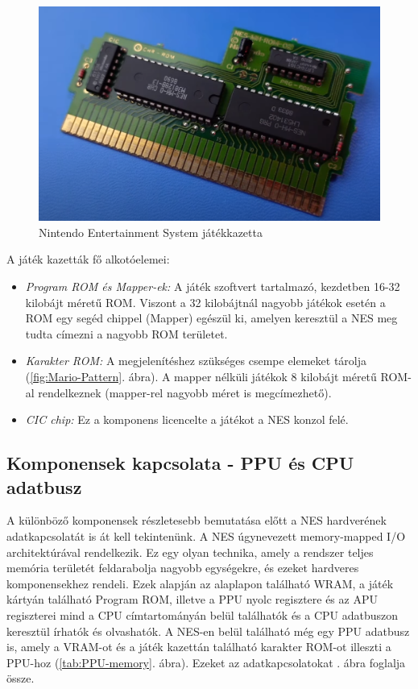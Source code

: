 \begin{figure}[H]
	\centering
	\includegraphics[width=150mm, keepaspectratio]{figures/Mario-Duckhunt-cartage}
	\caption{Nintendo Entertainment System játékkazetta \cite{NES_cartridge}}
	\label{fig:NES-Game-Cartridge}
\end{figure}

A  játék kazetták fő alkotóelemei:

\begin{itemize}
	\item \emph{Program ROM és Mapper-ek:} A játék szoftvert tartalmazó, kezdetben 16-32 kilobájt méretű ROM. Viszont a 32 kilobájtnál nagyobb játékok esetén a ROM egy segéd chippel (Mapper) egészül ki, amelyen keresztül a NES meg tudta címezni a nagyobb ROM területet. 
	\item \emph{Karakter ROM:} A megjelenítéshez szükséges csempe elemeket tárolja (\ref{fig:Mario-Pattern}. ábra). A mapper nélküli játékok 8 kilobájt méretű ROM-al rendelkeznek (mapper-rel nagyobb méret is megcímezhető). 
	\item \emph{CIC chip:} Ez a komponens licencelte a játékot a NES konzol felé.
\end{itemize}

	\subsection{Komponensek kapcsolata - PPU és CPU adatbusz}
	\label{sec:NES-connection-components}
	
	A különböző komponensek részletesebb bemutatása előtt a NES hardverének adatkapcsolatát is át kell tekintenünk. A NES úgynevezett memory-mapped I/O architektúrával rendelkezik. Ez egy olyan technika, amely a rendszer teljes memória területét feldarabolja nagyobb egységekre, és ezeket hardveres komponensekhez rendeli. Ezek alapján az alaplapon található WRAM, a játék kártyán található Program ROM, illetve a PPU nyolc regisztere és az APU regiszterei mind a CPU címtartományán belül találhatók és a CPU adatbuszon keresztül írhatók és olvashatók. A NES-en belül található még egy PPU adatbusz is, amely a VRAM-ot és a játék kazettán található karakter ROM-ot illeszti a PPU-hoz (\ref{tab:PPU-memory}. ábra). Ezeket az adatkapcsolatokat . ábra foglalja össze.
	
